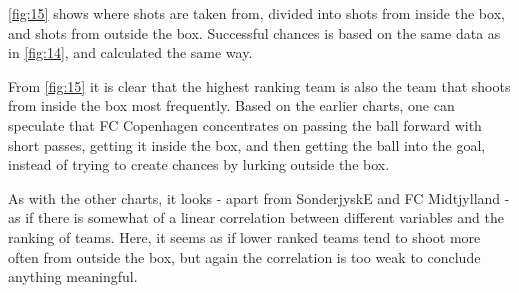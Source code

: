 \documentclass[Report.tex]{subfiles}
\begin{document}
\ref{fig:15} shows where shots are taken from, divided into shots from inside the
box, and shots from outside the box. Successful chances is based on the same
data as in \ref{fig:14}, and calculated the same way. 

From \ref{fig:15} it is clear that the highest ranking team is also the team that
shoots from inside the box most frequently. Based on the earlier charts, one can
speculate that FC Copenhagen concentrates on passing the ball forward with short
passes, getting it inside the box, and then getting the ball into the goal,
instead of trying to create chances by lurking outside the box. 

As with the other charts, it looks - apart from SonderjyskE and FC Midtjylland -
as if there is somewhat of a linear correlation between different variables and
the ranking of teams. Here, it seems as if lower ranked teams tend to shoot more
often from outside the box, but again the correlation is too weak to conclude
anything meaningful. 

	
\end{document}
